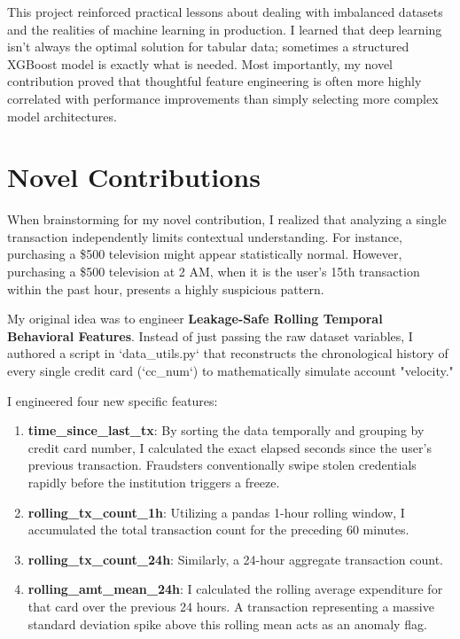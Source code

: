 \documentclass[11pt]{article}
\begin{document}
This project reinforced practical lessons about dealing with imbalanced datasets and the realities of machine learning in production. I learned that deep learning isn't always the optimal solution for tabular data; sometimes a structured XGBoost model is exactly what is needed. Most importantly, my novel contribution proved that thoughtful feature engineering is often more highly correlated with performance improvements than simply selecting more complex model architectures. 

\section{Novel Contributions}

When brainstorming for my novel contribution, I realized that analyzing a single transaction independently limits contextual understanding. For instance, purchasing a \$500 television might appear statistically normal. However, purchasing a \$500 television at 2 AM, when it is the user's 15th transaction within the past hour, presents a highly suspicious pattern. 

My original idea was to engineer \textbf{Leakage-Safe Rolling Temporal Behavioral Features}. Instead of just passing the raw dataset variables, I authored a script in `data\_utils.py` that reconstructs the chronological history of every single credit card (`cc\_num`) to mathematically simulate account "velocity."

I engineered four new specific features:
\begin{enumerate}
    \item \textbf{time\_since\_last\_tx}: By sorting the data temporally and grouping by credit card number, I calculated the exact elapsed seconds since the user's previous transaction. Fraudsters conventionally swipe stolen credentials rapidly before the institution triggers a freeze.
    \item \textbf{rolling\_tx\_count\_1h}: Utilizing a pandas 1-hour rolling window, I accumulated the total transaction count for the preceding 60 minutes.
    \item \textbf{rolling\_tx\_count\_24h}: Similarly, a 24-hour aggregate transaction count.
    \item \textbf{rolling\_amt\_mean\_24h}: I calculated the rolling average expenditure for that card over the previous 24 hours. A transaction representing a massive standard deviation spike above this rolling mean acts as an anomaly flag.
\end{enumerate}
\end{document}
